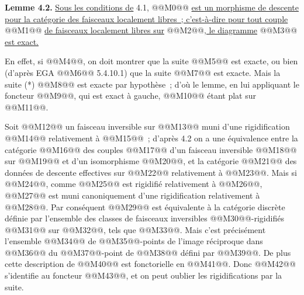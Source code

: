 
\textbf{Lemme 4.2.} \uline{Sous les conditions de} 4.1, @@M0@@ \uline{est un morphisme de descente pour la catégorie des faisceaux localement libres~; c'est-à-dire pour tout couple} @@M1@@ \uline{de faisceaux localement libres sur} @@M2@@\uline{, le diagramme}
@@M3@@
\uline{est exact.}

En effet, si @@M4@@, on doit montrer que la suite
@@M5@@
est exacte, ou bien (d'après EGA @@M6@@ 5.4.10.1) que la suite
@@M7@@
est exacte. Mais la suite (*) @@M8@@ est exacte par hypothèse~; d'où le lemme, en lui appliquant le foncteur @@M9@@, qui est exact à gauche, @@M10@@ étant plat sur @@M11@@.

Soit @@M12@@ un faisceau inversible sur @@M13@@ muni d'une rigidification @@M14@@ relativement à @@M15@@~; d'après 4.2 on a une équivalence entre la catégorie @@M16@@ des couples @@M17@@ d'un faisceau inversible @@M18@@ sur @@M19@@ et d'un isomorphisme @@M20@@, et la catégorie @@M21@@ des données de descente effectives sur @@M22@@ relativement à @@M23@@. Mais si @@M24@@, comme @@M25@@ est rigidifié relativement à @@M26@@, @@M27@@ est muni canoniquement d'une rigidification relativement à @@M28@@. Par conséquent @@M29@@ est équivalente à la catégorie discrète définie par l'ensemble des classes de faisceaux inversibles @@M30@@-rigidifiés @@M31@@ sur @@M32@@, tels que @@M33@@. Mais c'est précisément l'ensemble @@M34@@ de @@M35@@-points de l'image réciproque dans @@M36@@ du @@M37@@-point de @@M38@@ défini par @@M39@@. De plus cette description de @@M40@@ est fonctorielle en @@M41@@. Donc @@M42@@ s'identifie au foncteur @@M43@@, et on peut oublier les rigidifications par la suite.

